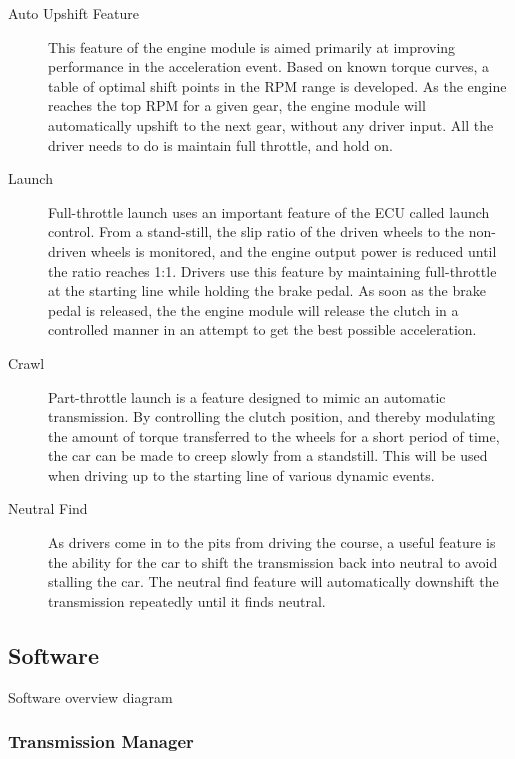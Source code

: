 \begin{description}

\item[Auto Upshift Feature]

This feature of the engine module is aimed primarily at improving performance in the acceleration event. Based on known torque curves, a table of optimal shift points in the RPM range is developed. As the engine reaches the top RPM for a given gear, the engine module will automatically upshift to the next gear, without any driver input. All the driver needs to do is maintain full throttle, and hold on.

\item[Launch]
Full-throttle launch uses an important feature of the ECU called launch control. From a stand-still, the slip ratio of the driven wheels to the non-driven wheels is monitored, and the engine output power is reduced until the ratio reaches 1:1. Drivers use this feature by maintaining full-throttle at the starting line while holding the brake pedal. As soon as the brake pedal is released, the the engine module will release the clutch in a controlled manner in an attempt to get the best possible acceleration.

\item[Crawl]
Part-throttle launch is a feature designed to mimic an automatic transmission. By controlling the clutch position, and thereby modulating the amount of torque transferred to the wheels for a short period of time, the car can be made to creep slowly from a standstill. This will be used when driving up to the starting line of various dynamic events.

\item[Neutral Find]
As drivers come in to the pits from driving the course, a useful feature is the ability for the car to shift the transmission back into neutral to avoid stalling the car. The neutral find feature will automatically downshift the transmission repeatedly until it finds neutral.

\end{description}


\subsection{Software}

Software overview diagram


\subsubsection{Transmission Manager}

